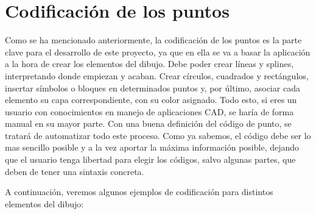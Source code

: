 \section{Codificación de los puntos}

Como se ha mencionado anteriormente, la codificación de los puntos es la parte clave para el desarrollo de este proyecto, ya que en ella se va a basar la aplicación a la hora de crear los elementos del dibujo.
Debe poder crear líneas y splines, interpretando donde empiezan y acaban. Crear círculos, cuadrados y rectángulos, insertar símbolos o bloques en determinados puntos y, por último, asociar cada elemento su capa correspondiente, con su color asignado.
Todo esto, si eres un usuario con conocimientos en manejo de aplicaciones CAD, se haría de forma manual en su mayor parte. Con una buena definición del código de punto, se tratará de automatizar todo este proceso.
Como ya sabemos, el código debe ser lo mas sencillo posible y a la vez aportar la máxima información posible, dejando que el usuario tenga libertad para elegir los códigos, salvo algunas partes, que deben de tener una sintaxis concreta. 

A continuación, veremos algunos ejemplos de codificación para distintos elementos del dibujo:

